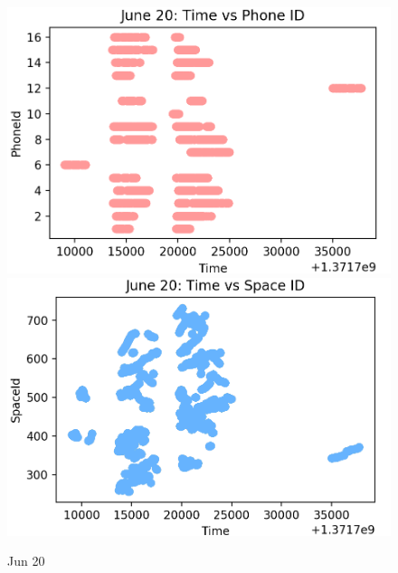 \begin{figure}[!h]
    \centering
    \includegraphics[width=.48\textwidth]{image/Chapters/Chapter6/june20timephone.png}
        \includegraphics[width=.48\textwidth]{image/Chapters/Chapter6/june20timespace.png}
    \\[\smallskipamount]    
  
    \caption{ Jun 20  }
    \label{jun20dat}
\end{figure}




